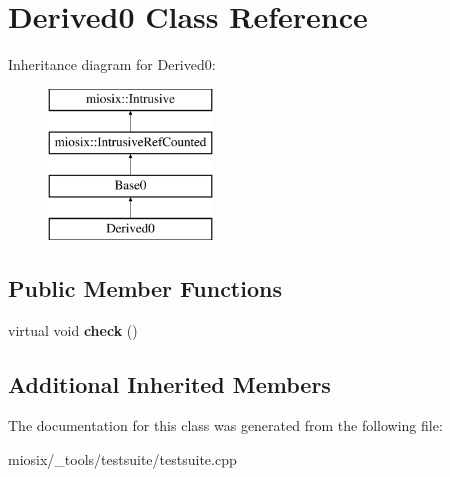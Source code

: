\hypertarget{class_derived0}{\section{Derived0 Class Reference}
\label{class_derived0}
}
Inheritance diagram for Derived0\-:\begin{figure}[H]
\begin{center}
\leavevmode
\includegraphics[height=4.000000cm]{class_derived0}
\end{center}
\end{figure}
\subsection*{Public Member Functions}
\begin{DoxyCompactItemize}
\item 
\hypertarget{class_derived0_a9c8b74bf85e3367616b3008bfec3bc30}{virtual void {\bfseries check} ()}\label{class_derived0_a9c8b74bf85e3367616b3008bfec3bc30}

\end{DoxyCompactItemize}
\subsection*{Additional Inherited Members}


The documentation for this class was generated from the following file\-:\begin{DoxyCompactItemize}
\item 
miosix/\-\_\-tools/testsuite/testsuite.\-cpp\end{DoxyCompactItemize}
